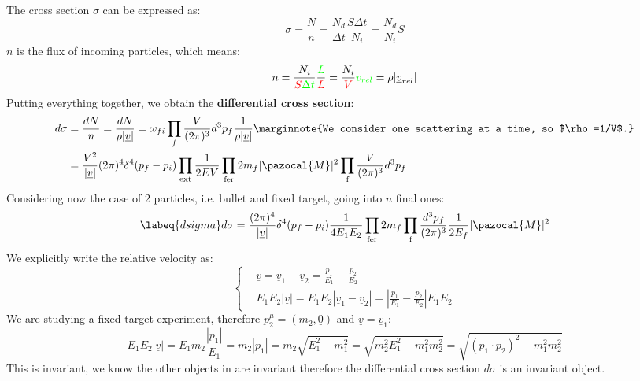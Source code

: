 \documentclass[../main.tex]{subfiles}
\begin{document}
The cross section $\sigma$ can be expressed as:
\[
\sigma=\frac{N}{n}=\frac{N_d}{\Delta t}\frac{S\Delta t}{N_i}=\frac{N_d}{N_i}S
\]
$n$ is the flux of incoming particles, which means:
\[
n=\frac{N_i}{{\color{red}S}{\color{green}\Delta t}}\frac{{\color{green}L}}{{\color{red}L}}=\frac{N_i}{{\color{red}V}}{\color{green}v_{rel}}=\rho|\underline{v}_{rel}|
\]
Putting everything together, we obtain the \textbf{differential cross section}:
\begin{align*}
d\sigma&=\frac{dN}{n}=\frac{dN}{\rho|\underline{v}|}=\omega_{fi}\prod_f\frac{V}{(2\pi)^3}d^3p_f\frac{1}{\rho|\underline{v}|}\marginnote{We consider one scattering at a time, so $\rho=1/V$.}\\
&=\frac{V^2}{|\underline{v}|}(2\pi)^4\delta^4(p_f-p_i)\prod_{\text{ext}}\frac{1}{2EV}\prod_{\text{fer}}2m_f|\pazocal{M}|^2\prod_{\text{f}}\frac{V}{(2\pi)^3}d^3p_f
\end{align*}
Considering now the case of 2 particles, i.e. bullet and fixed target, going into $n$ final ones:
\begin{equation}
\labeq{dsigma}
d\sigma=\frac{(2\pi)^4}{|\underline{v}|}\delta^4(p_f-p_i)\frac{1}{4E_1E_2}\prod_{\text{fer}}2m_f\prod_{\text{f}}\frac{d^3p_f}{(2\pi)^3}\frac{1}{2E_f}|\pazocal{M}|^2
\end{equation}
We explicitly write the relative velocity as:
\[
\left\{
\begin{aligned}
&\underline{v}=\underline{v}_1-\underline{v}_2=\frac{p_1}{E_1}-\frac{p_2}{E_2}\\
&E_1E_2|\underline{v}|=E_1E_2|\underline{v}_1-\underline{v}_2|=\left|\frac{p_1}{E_1}-\frac{p_2}{E_2}\right|E_1E_2
\end{aligned}
\right.
\]
We are studying a fixed target experiment, therefore $p_2^\mu=(m_2,\underline{0})$ and $\underline{v}=\underline{v}_1$:
\[
E_1E_2|\underline{v}|=E_1m_2\frac{|p_1|}{E_1}=m_2|p_1|=m_2\sqrt{E_1^2-m_1^2}=\sqrt{m_2^2E_1^2-m_1^2m_2^2}=\sqrt{(p_1\cdot p_2)^2-m_1^2m_2^2}
\]
This is invariant, we know the other objects in  are invariant therefore the differential cross section $d\sigma$ is an invariant object.
\end{document}
